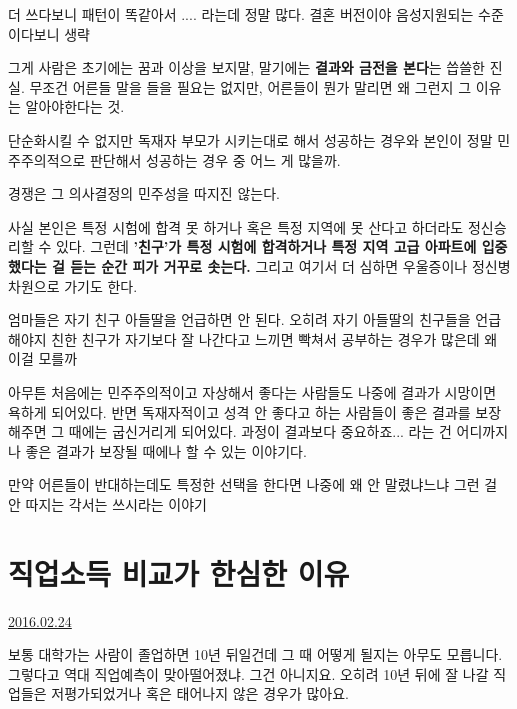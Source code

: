더 쓰다보니 패턴이 똑같아서 .... 라는데 정말 많다. 결혼 버전이야 음성지원되는 수준이다보니 생략
\vspace{5mm}

그게 사람은 초기에는 꿈과 이상을 보지말, 말기에는 \textbf{결과와 금전을 본다}는 씁쓸한 진실.
무조건 어른들 말을 들을 필요는 없지만, 어른들이 뭔가 말리면 왜 그런지 그 이유는 알아야한다는 것.
\vspace{5mm}

단순화시킬 수 없지만
독재자 부모가 시키는대로 해서 성공하는 경우와
본인이 정말 민주주의적으로 판단해서 성공하는 경우 중 어느 게 많을까.
\vspace{5mm}

경쟁은 그 의사결정의 민주성을 따지진 않는다.
\vspace{5mm}

사실 본인은 특정 시험에 합격 못 하거나 혹은 특정 지역에 못 산다고 하더라도 정신승리할 수 있다.
그런데 \textbf{'친구'가 특정 시험에 합격하거나 특정 지역 고급 아파트에 입중했다는 걸 듣는 순간 피가 거꾸로 솟는다.}
그리고 여기서 더 심하면 우울증이나 정신병 차원으로 가기도 한다.
\vspace{5mm}

엄마들은 자기 친구 아들딸을 언급하면 안 된다. 오히려 자기 아들딸의 친구들을 언급해야지
친한 친구가 자기보다 잘 나간다고 느끼면 빡쳐서 공부하는 경우가 많은데 왜 이걸 모를까
\vspace{5mm}

아무튼
처음에는 민주주의적이고 자상해서 좋다는 사람들도 나중에 결과가 시망이면 욕하게 되어있다.
반면 독재자적이고 성격 안 좋다고 하는 사람들이 좋은 결과를 보장해주면 그 때에는 굽신거리게 되어있다.
과정이 결과보다 중요하죠... 라는 건 어디까지나 좋은 결과가 보장될 때에나 할 수 있는 이야기다.
\vspace{5mm}

만약 어른들이 반대하는데도 특정한 선택을 한다면 나중에 왜 안 말렸냐느냐 그런 걸 안 따지는 각서는 쓰시라는 이야기
\vspace{5mm}






\section{직업소득 비교가 한심한 이유}
\href{https://www.kockoc.com/Apoc/649588}{2016.02.24}

\vspace{5mm}

보통 대학가는 사람이 졸업하면 10년 뒤일건데 그 때 어떻게 될지는 아무도 모릅니다.
그렇다고 역대 직업예측이 맞아떨어졌냐. 그건 아니지요.
오히려 10년 뒤에 잘 나갈 직업들은 저평가되었거나 혹은 태어나지 않은 경우가 많아요.
\vspace{5mm}

